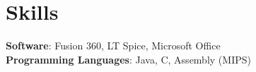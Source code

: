 \section{Skills}
 \begin{itemize}[leftmargin=0.15in, label={}]
    \small{\item{
     \textbf{Software}{: Fusion 360, LT Spice, Microsoft Office} \\
     \textbf{Programming Languages}{: Java, C, Assembly (MIPS)} \\
    }}
 \end{itemize}
